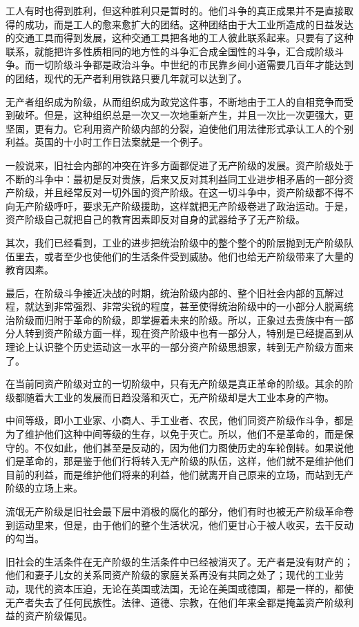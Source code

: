 \documentclass[UTF8]{ctexart}
\begin{document}
工人有时也得到胜利，但这种胜利只是暂时的。他们斗争的真正成果并不是直接取得的成功，而是工人的愈来愈扩大的团结。这种团结由于大工业所造成的日益发达的交通工具而得到发展，这种交通工具把各地的工人彼此联系起来。只要有了这种联系，就能把许多性质相同的地方性的斗争汇合成全国性的斗争，汇合成阶级斗争。而一切阶级斗争都是政治斗争。中世纪的市民靠乡间小道需要几百年才能达到的团结，现代的无产者利用铁路只要几年就可以达到了。

无产者组织成为阶级，从而组织成为政党这件事，不断地由于工人的自相竞争而受到破坏。但是，这种组织总是一次又一次地重新产生，并且一次比一次更强大，更坚固，更有力。它利用资产阶级内部的分裂，迫使他们用法律形式承认工人的个别利益。英国的十小时工作日法案就是一个例子。

一般说来，旧社会内部的冲突在许多方面都促进了无产阶级的发展。资产阶级处于不断的斗争中：最初是反对贵族，后来又反对其利益同工业进步相矛盾的一部分资产阶级，并且经常反对一切外国的资产阶级。在这一切斗争中，资产阶级都不得不向无产阶级呼吁，要求无产阶级援助，这样就把无产阶级卷进了政治运动。于是，资产阶级自己就把自己的教育因素即反对自身的武器给予了无产阶级。

其次，我们已经看到，工业的进步把统治阶级中的整个整个的阶层抛到无产阶级队伍里去，或者至少也使他们的生活条件受到威胁。他们也给无产阶级带来了大量的教育因素。

最后，在阶级斗争接近决战的时期，统治阶级内部的、整个旧社会内部的瓦解过程，就达到非常强烈、非常尖锐的程度，甚至使得统治阶级中的一小部分人脱离统治阶级而归附于革命的阶级，即掌握着未来的阶级。所以，正象过去贵族中有一部分人转到资产阶级方面一样，现在资产阶级中也有一部分人，特别是已经提高到从理论上认识整个历史运动这一水平的一部分资产阶级思想家，转到无产阶级方面来了。

在当前同资产阶级对立的一切阶级中，只有无产阶级是真正革命的阶级。其余的阶级都随着大工业的发展而日趋没落和灭亡，无产阶级却是大工业本身的产物。

中间等级，即小工业家、小商人、手工业者、农民，他们同资产阶级作斗争，都是为了维护他们这种中间等级的生存，以免于灭亡。所以，他们不是革命的，而是保守的。不仅如此，他们甚至是反动的，因为他们力图使历史的车轮倒转。如果说他们是革命的，那是鉴于他们行将转入无产阶级的队伍，这样，他们就不是维护他们目前的利益，而是维护他们将来的利益，他们就离开自己原来的立场，而站到无产阶级的立场上来。

流氓无产阶级是旧社会最下层中消极的腐化的部分，他们有时也被无产阶级革命卷到运动里来，但是，由于他们的整个生活状况，他们更甘心于被人收买，去干反动的勾当。

旧社会的生活条件在无产阶级的生活条件中已经被消灭了。无产者是没有财产的；他们和妻子儿女的关系同资产阶级的家庭关系再没有共同之处了；现代的工业劳动，现代的资本压迫，无论在英国或法国，无论在美国或德国，都是一样的，都使无产者失去了任何民族性。法律、道德、宗教，在他们年来全都是掩盖资产阶级利益的资产阶级偏见。
\end{document}
